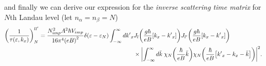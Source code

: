 and finally we can derive our expression for the \textit{inverse
scattering time matrix} for $N$th Landau level (let $n_{\alpha} = n_{\beta} = N$)
\begin{equation} \label{4.65}
  \begin{aligned}
    \qty(\frac{1}{\tau(\varepsilon,k_x)})^{ll'}_{N} =
    \frac { N_{imp}^2 A^2 \hbar V_{imp}}{16\pi^4 \qty(eB)^2}
    \delta(\varepsilon - \varepsilon_{N})
    \int_{-\infty}^{\infty} d {k'}_x
    &
    J_l\qty(\frac{g\hbar}{eB}[{k}_x - {k'}_x])
    J_{l'}\qty(\frac{g\hbar}{eB}[{k}_x - {k'}_x]) \\
    & \times
    \qty|
    \int_{-\infty}^{\infty} d\bar{k} \;
    {\chi}_{N}\qty(\frac{\hbar}{eB}\bar{k})
    {\chi}_{N}\qty(\frac{\hbar}{eB} \qty[{k'}_x - {k}_x - \bar{k}])|^2.
  \end{aligned}
\end{equation}
